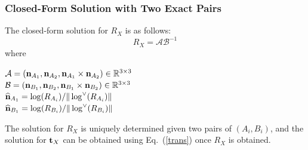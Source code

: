 \documentclass[twocolumn,10pt]{asme2ej}
\newcommand{\nn}{{\bf n}}
\newcommand{\ttt}{{\bf t}}
\begin{document}
\subsubsection{Closed-Form Solution with Two Exact Pairs}
The closed-form solution for $R_{X}$ is as follows:
\begin{equation}
R_{X} = \mathcal{A}\mathcal{B}^{-1}
\label{Lie_Rotation}
\end{equation}
where\\

\begin{center}
$\mathcal{A} = (\nn_{A_{1}}, \nn_{A_{2}}, \nn_{A_{1}} \times \nn_{A_{2}}) \in \mathbb{R}^{3 \times 3}$\\
 $\mathcal{B} = (\nn_{B_{1}}, \nn_{B_{2}}, \nn_{B_{1}} \times \nn_{B_{2}}) \in \mathbb{R}^{3 \times 3} $\\
$\widehat{\nn}_{A_{1}} = \log(R_{A_{i}})/\|\log^\vee(R_{A_i})\|$\\
$\widehat{\nn}_{B_{1}} = \log(R_{B_{i}})/\|\log^\vee(R_{B_i})\|$
\end{center}
The solution for $R_X$ is uniquely determined given two pairs of $(A_i, B_i)$, and the solution for $\ttt_{X}$ can be obtained using Eq.~(\ref{trans}) once $R_{X}$ is obtained.\\

\end{document}
